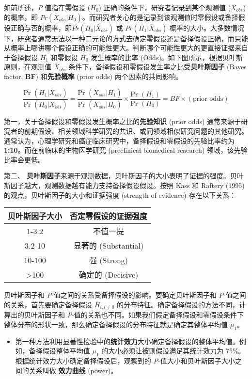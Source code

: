 \documentclass[]{article}
\providecommand{\tightlist}{%
  \setlength{\itemsep}{0pt}\setlength{\parskip}{0pt}}
\begin{document}
如前所述，\emph{P} 值指在零假设 (\(H_0\))
正确的条件下，研究者记录到某个观测值 (\(\overline{X}_{obs}\)) 的概率，即
\(Pr(\overline{X}_{obs}|H_0)\)。而研究者关心的是记录到该观测值时零假设或备择假设正确与否的概率，即\(Pr(H_0|\overline{X}_{obs})\)
或 \(Pr(H_1|\overline{X}_{obs})\)
概率的大小。大多数情况下，研究者通常无法以一种二元论的方式去确定零假设还是备择假设正确，而只能从概率上哪讲哪个假设正确的可能性更大。判断哪个可能性更大的更直接证据来自于备择假设
\(H_1\) 和零假设 \(H_0\) 发生概率的比率
(Odds)。如下图所示，根据贝叶斯原则，在观测值 \(\overline{X}_{obs}\)
条件下，备择假设和零假设发生率之比受\textbf{贝叶斯因子} (Bayes factor,
\textbf{BF}) 和\textbf{先验概率} (prior odds) 两个因素的共同影响。

\[
\frac{\text{Pr }(H_1|\overline{X}_{obs})}{\text{Pr }(H_0|\overline{X}_{obs})}=
\frac{\text{Pr }(\overline{X}_{obs}|H_1)}{\text{Pr }(\overline{X}_{obs}|H_0)}\times
\frac{\text{Pr }(H_1)}{\text{Pr }(H_0)}=
BF \times (\text{prior odds})
\]

第一，关于备择假设和零假设发生概率之比的\textbf{先验知识} (prior odds)
通常来源于研究者的前期假设、相关领域科学研究的共识、或同领域相似研究问题的其他研究。通常认为，心理学研究和癌症临床研究中，备择假设和零假设的先验比率约为
\textbf{1:10}。而在前临床的生物医学研究 (preclinical biomedical
reaearch) 领域，该先验比率会更低。

第二、
\textbf{贝叶斯因子}来源于观测数据，贝叶斯因子的大小表明了证据的强度。贝叶斯因子越大，观测数据越有能力支持备择假设假设。按照
Kass 和 Raftery (1995) 的观点，贝叶斯因子的大小和证据强度 (strength of
evidence) 存在以下关系：

\begin{longtable}[]{@{}cc@{}}
\toprule
贝叶斯因子大小 & 否定零假设的证据强度\tabularnewline
\midrule
\endhead
1-3.2 & 不值一提\tabularnewline
3.2-10 & 显著的 (Substantial)\tabularnewline
10-100 & 强 (Strong)\tabularnewline
\textgreater{}100 & 确定的 (Decisive)\tabularnewline
\bottomrule
\end{longtable}

贝叶斯因子和 \emph{P}-值之间的关系受备择假设的影响。要确定贝叶斯因子和
\emph{P}-值之间的关系，首先要确定备择假设 \(\overline{H}_{i,i\neq0}\)
的分布特征。确定备择假设的方法不同，计算出的贝叶斯因子和
\emph{P}-值的关系也不同。如果我们假定备择假设和零假设条件下整体分布的形状一致，那么确定备择假设的分布特征就是确定其整体平均值
\(\mu_1\)。

\begin{itemize}
\tightlist
\item
  第一种方法利用显著性检验中的\textbf{统计效力}大小确定备择假设的整体平均值。例如，备择假设整体平均值
  \(\mu_1\) 的大小必须让被则假设满足其统计效力为
  75\%。根据统计效力大小确定备择假设后，观察到的
  \emph{P}-值大小和贝叶斯因子大小之间的关系叫做 \textbf{效力曲线}
  (power)。
\end{itemize}
\end{document}
